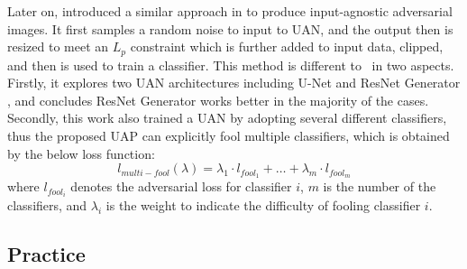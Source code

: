 
Later on, \cite{poursaeed2017generative} introduced a similar approach in\cite{hayes2018learning} to produce input-agnostic adversarial images. It first samples a random noise to input to UAN, and the output then is resized to meet an $L_p$ constraint which is further added to input data, clipped, and then is used to train a classifier. This method is different to~\cite{hayes2018learning} in two aspects. Firstly, it explores two UAN architectures including U-Net \cite{ronneberger2015u} and ResNet Generator \cite{johnson2016perceptual}, and concludes ResNet Generator works better in the majority of the cases. 
% 
Secondly, this work also trained a UAN by adopting several different classifiers, thus the proposed UAP can explicitly fool multiple classifiers, which is obtained by the below loss function:
%
\begin{equation}
    l_{multi-fool}(\lambda) = \lambda_1 \cdot l_{fool_1} + \dots + \lambda_m \cdot l_{fool_m}
\end{equation}
where $l_{fool_i}$ denotes the adversarial loss for classifier $i$, $m$ is the number of the classifiers, and $\lambda_i$ is the weight to indicate the difficulty of fooling classifier $i$.



\subsection{Practice}


